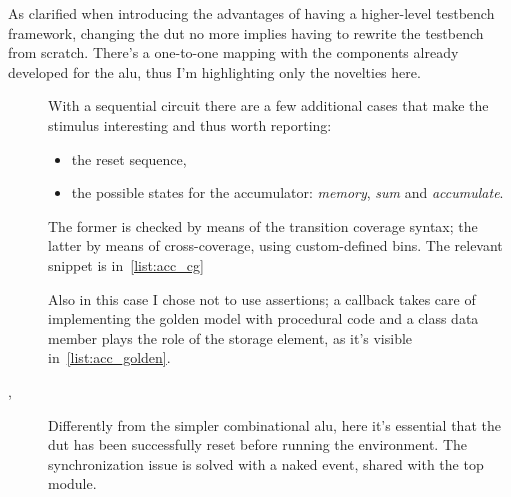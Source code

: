 \noindent As clarified when introducing the advantages of having a higher-level testbench framework, changing the \ac{dut} no more implies having to rewrite the testbench from scratch. There's a one-to-one mapping with the components already developed for the \ac{alu}, thus I'm highlighting only the novelties here.
\begin{description}
    \item[] With a sequential circuit there are a few additional cases that make the stimulus interesting and thus worth reporting:
    \begin{itemize}
        \item the reset sequence,
        \item the possible states for the accumulator: \emph{memory}, \emph{sum} and \emph{accumulate}.
    \end{itemize}
     The former is checked by means of the transition coverage syntax; the latter by means of cross-coverage, using custom-defined bins. The relevant snippet is in~\cref{list:acc_cg}

     \item[] Also in this case I chose not to use \sv assertions; a callback takes care of implementing the golden model with procedural code and a class data member plays the role of the storage element, as it's visible in~\cref{list:acc_golden}.

     \item[, ] Differently from the simpler combinational \ac{alu}, here it's essential that the \ac{dut} has been successfully reset before running the environment. The synchronization issue is solved with a naked event, shared with the top module.
\end{description}
